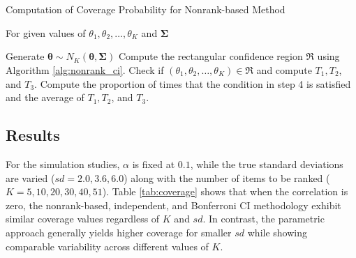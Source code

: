 \documentclass[
  12pt,
  a4paper,
]{article}
\numberwithin{equation}{section}
\begin{document}
\begin{algorithm}[H]
    \caption{Computation of Coverage Probability for Nonrank-based Method} 
    \label{alg:nonrank_cov}
    For given values of $\theta_1, \theta_2, \dots, \theta_K$ and $\boldsymbol{\Sigma}$
    \begin{algorithmic}[1] %
            \State Generate $\boldsymbol{\hat\theta} \sim N_K(\boldsymbol{\theta}, \boldsymbol{\Sigma})$
            \State Compute the rectangular confidence region $\mathfrak{R}$ using Algorithm \ref{alg:nonrank_ci}.
            \State Check if $\left( \theta_1, \theta_2, \dots, \theta_K\right) \in \mathfrak{R}$ and compute $T_1, T_2$, and $T_3$.
        \EndFor
    \State Compute the proportion of times that the condition in step 4 is satisfied and the average of $T_1, T_2$, and $T_3$.
    \end{algorithmic} %
\end{algorithm}

\subsection{Results}\label{results}

For the simulation studies, \(\alpha\) is fixed at \(0.1\), while the true standard deviations are varied (\(sd = 2.0, 3.6, 6.0\)) along with the number of items to be ranked (\(K = 5, 10, 20, 30, 40, 51\)). Table \ref{tab:coverage} shows that when the correlation is zero, the nonrank-based, independent, and Bonferroni CI methodology exhibit similar coverage values regardless of \(K\) and \(sd\). In contrast, the parametric approach generally yields higher coverage for smaller \(sd\) while showing comparable variability across different values of \(K\).
\end{document}
